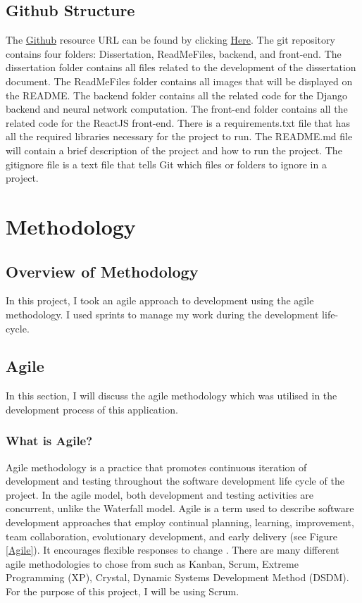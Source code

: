 \section{Github Structure}

The \href{https://github.com/MarkReillyGMIT/AppliedProject}{Github} resource URL can be found by clicking \href{https://github.com/MarkReillyGMIT/AppliedProject}{Here}. The git repository contains four folders: Dissertation, ReadMeFiles, backend, and front-end. The dissertation folder contains all files related to the development of the dissertation document. The ReadMeFiles folder contains all images that will be displayed on the README. The backend folder contains all the related code for the Django backend and neural network computation. The front-end folder contains all the related code for the ReactJS front-end. There is a requirements.txt file that has all the required libraries necessary for the project to run. The README.md file will contain a brief description of the project and how to run the project. The gitignore file is a text file that tells Git which files or folders to ignore in a project. 


\chapter{Methodology}

\section{Overview of Methodology}

In this project, I took an agile approach to development using the agile methodology. I used sprints to manage my work during the development life-cycle.

\section{Agile}
In this section, I will discuss the agile methodology which was utilised in the development process of this application.

\subsection{What is Agile?}
Agile methodology is a practice that promotes continuous iteration of development and testing throughout the software development life cycle of the project. In the agile model, both development and testing activities are concurrent, unlike the Waterfall model\cite{Agile}. Agile is a term used to describe software development approaches that employ continual planning, learning, improvement, team collaboration, evolutionary development, and early delivery (see Figure \ref{Agile}). It encourages flexible responses to change \cite{Agile}. There are many different agile methodologies to chose from such as Kanban, Scrum, Extreme Programming (XP), Crystal, Dynamic Systems Development Method (DSDM). For the purpose of this project, I will be using Scrum. 

